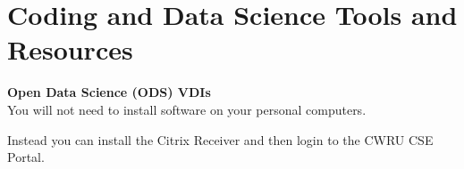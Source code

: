\documentclass[11pt]{article} %
\begin{document}
%
%
%
%
%
%
%




\section{Coding and Data Science Tools and Resources}

{\bf Open Data Science (ODS) VDIs} \\

You will not need to install software on your personal computers.  

Instead you can install the Citrix Receiver \cite{citrix_citrix_2014} and then login to the CWRU CSE Portal. \cite{cse_portal_cwru_2014} 
\end{document}
